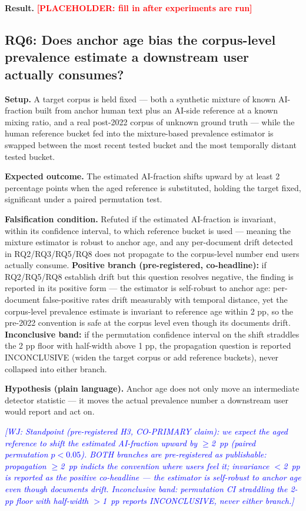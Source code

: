 \documentclass[conference]{IEEEtran}
\newcommand{\placeholder}[1]{\textcolor{red}{\textbf{[PLACEHOLDER: #1]}}}
\newcommand{\wj}[1]{\textcolor{blue}{\emph{[WJ: #1]}}}
\begin{document}
\textbf{Result.} \placeholder{fill in after experiments are run}

\subsection{RQ6: Does anchor age bias the corpus-level prevalence estimate a downstream user actually consumes?}

 \textbf{Setup.} A target corpus is held fixed --- both a synthetic mixture of known AI-fraction built from anchor human text plus an AI-side reference at a known mixing ratio, and a real post-2022 corpus of unknown ground truth --- while the human reference bucket fed into the mixture-based prevalence estimator is swapped between the most recent tested bucket and the most temporally distant tested bucket.

\textbf{Expected outcome.} The estimated AI-fraction shifts upward by at least 2 percentage points when the aged reference is substituted, holding the target fixed, significant under a paired permutation test.

\textbf{Falsification condition.} Refuted if the estimated AI-fraction is invariant, within its confidence interval, to which reference bucket is used --- meaning the mixture estimator is robust to anchor age, and any per-document drift detected in RQ2/RQ3/RQ5/RQ8 does not propagate to the corpus-level number end users actually consume. \textbf{Positive branch (pre-registered, co-headline):} if RQ2/RQ5/RQ8 establish drift but this question resolves negative, the finding is reported in its positive form --- the estimator is self-robust to anchor age: per-document false-positive rates drift measurably with temporal distance, yet the corpus-level prevalence estimate is invariant to reference age within 2 pp, so the pre-2022 convention is safe at the corpus level even though its documents drift. \textbf{Inconclusive band:} if the permutation confidence interval on the shift straddles the 2 pp floor with half-width above 1 pp, the propagation question is reported INCONCLUSIVE (widen the target corpus or add reference buckets), never collapsed into either branch.

\textbf{Hypothesis (plain language).} Anchor age does not only move an intermediate detector statistic --- it moves the actual prevalence number a downstream user would report and act on.

\wj{Standpoint (pre-registered H3, CO-PRIMARY claim): we expect the aged reference to shift the estimated AI-fraction upward by $\geq$2~pp (paired permutation $p<0.05$). BOTH branches are pre-registered as publishable: propagation $\geq$2~pp indicts the convention where users feel it; invariance $<$2~pp is reported as the positive co-headline --- the estimator is self-robust to anchor age even though documents drift. Inconclusive band: permutation CI straddling the 2-pp floor with half-width $>$1~pp reports INCONCLUSIVE, never either branch.}
\end{document}
